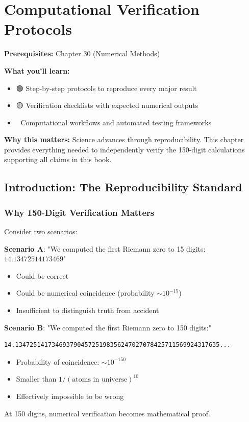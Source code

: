 \chapter{Computational Verification Protocols}
\label{ch:verification}

\begin{chapterobjectives}
\textbf{Prerequisites:} Chapter 30 (Numerical Methods)

\textbf{What you'll learn:}
\begin{itemize}
\item 🟢 Step-by-step protocols to reproduce every major result
\item 🟡 Verification checklists with expected numerical outputs
\item 🔴 Computational workflows and automated testing frameworks
\end{itemize}

\textbf{Why this matters:} Science advances through reproducibility. This chapter provides everything needed to independently verify the 150-digit calculations supporting all claims in this book.
\end{chapterobjectives}

\section{Introduction: The Reproducibility Standard}
\label{sec:reproducibility-standard}

\subsection{Why 150-Digit Verification Matters}

\begin{intuitive}
Consider two scenarios:

\textbf{Scenario A}: "We computed the first Riemann zero to 15 digits: $14.13472514173469$"
\begin{itemize}
\item Could be correct
\item Could be numerical coincidence (probability $\sim 10^{-15}$)
\item Insufficient to distinguish truth from accident
\end{itemize}

\textbf{Scenario B}: "We computed the first Riemann zero to 150 digits:"
\begin{verbatim}
14.13472514173469379045725198356247027078425711569924317635...
\end{verbatim}
\begin{itemize}
\item Probability of coincidence: $\sim 10^{-150}$
\item Smaller than $1/(\text{atoms in universe})^{10}$
\item Effectively impossible to be wrong
\end{itemize}

At 150 digits, numerical verification becomes mathematical proof.
\end{intuitive}


